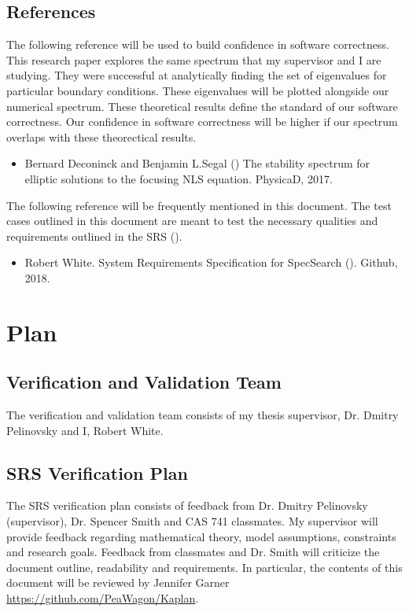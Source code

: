 \documentclass[12pt, titlepage]{article}
\begin{document}
\subsection{References}
\label{REF1}
The following reference will be used to build confidence in software 
correctness. This research paper explores the same spectrum that my supervisor 
and I are studying. They were successful at analytically finding the set of 
eigenvalues for particular boundary conditions. These eigenvalues will be 
plotted alongside our numerical spectrum. These theoretical results define the 
standard of our software correctness. Our confidence in software correctness 
will be higher if our spectrum overlaps with these theorectical results. 
\begin{itemize} 
	\item 	Bernard Deconinck and Benjamin L.Segal (\cite{SegaletAl}) 
	The stability spectrum for elliptic solutions to the focusing NLS equation. 
	PhysicaD, 2017.  
\end{itemize} 
The following reference will be frequently mentioned in this document. The 
test cases outlined in this document are meant to test the necessary qualities 
and requirements outlined in the SRS (\cite{SRS}). 
\begin{itemize}
	\item Robert White. System Requirements Specification for SpecSearch 
	(\cite{SRS}). 
	Github, 2018. 
\end{itemize}  

\section{Plan}
	 
\subsection{Verification and Validation Team}
\label{VnVTeam}
The verification and validation team consists of my thesis supervisor, Dr. 
Dmitry Pelinovsky and I, Robert White. \\

\subsection{SRS Verification Plan}
\label{SRSVerPlan}
The SRS verification plan consists of feedback from Dr. Dmitry Pelinovsky 
(supervisor), Dr. Spencer Smith and CAS 741 classmates. My supervisor will 
provide feedback regarding mathematical theory, model assumptions, constraints 
and research goals. Feedback from classmates and Dr. Smith will criticize the 
document outline, readability and requirements. In particular, the contents of 
this document will be reviewed by Jennifer Garner 
\url{https://github.com/PeaWagon/Kaplan}. 
\end{document}
